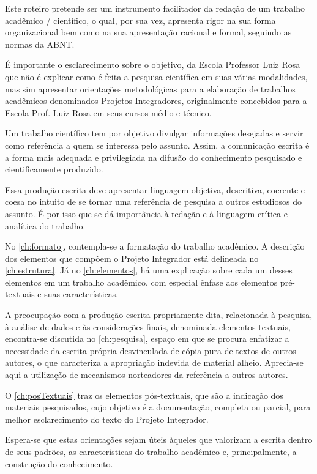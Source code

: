 \documentclass[
	12pt,				%
	openright,			%
	oneside,			%
	a4paper,			%
	english,			%
	french,				%
	spanish,			%
	brazil				%
	]{abntex2}
\begin{document}
\par Este roteiro pretende ser um instrumento facilitador da redação de um trabalho acadêmico / científico, o qual, por sua vez, apresenta rigor na sua forma organizacional bem como na sua apresentação racional e formal, seguindo as normas da ABNT.
\par É importante o esclarecimento sobre o objetivo, da Escola Professor Luiz Rosa que não é explicar como é feita a pesquisa científica em suas várias modalidades, mas sim apresentar orientações metodológicas para a elaboração de trabalhos acadêmicos denominados Projetos Integradores, originalmente concebidos para a Escola Prof. Luiz Rosa em seus cursos médio e técnico.
\par Um trabalho científico tem por objetivo divulgar informações desejadas e servir como referência a quem se interessa pelo assunto. Assim, a comunicação escrita é a forma mais adequada e privilegiada na difusão do conhecimento pesquisado e cientificamente produzido.
\par Essa produção escrita deve apresentar linguagem objetiva, descritiva, coerente e coesa no intuito de se tornar uma referência de pesquisa a outros estudiosos do assunto. É por isso que se dá importância à redação e à linguagem crítica e analítica do trabalho.
\par No \autoref{ch:formato}, contempla-se a formatação do trabalho acadêmico. A descrição dos elementos que compõem o Projeto Integrador está delineada no \autoref{ch:estrutura}.  Já no \autoref{ch:elementos}, há uma explicação sobre cada um desses elementos em um trabalho acadêmico, com especial ênfase aos elementos pré-textuais e suas características.
\par A preocupação com a produção escrita propriamente dita, relacionada à pesquisa, à análise de dados e às considerações finais, denominada elementos textuais, encontra-se discutida no \autoref{ch:pesquisa}, espaço em que se procura enfatizar a necessidade da escrita própria desvinculada de cópia pura de textos de outros autores, o que caracteriza a apropriação indevida de material alheio. Aprecia-se aqui a utilização de mecanismos norteadores da referência a outros autores.
\par O \autoref{ch:posTextuais} traz os elementos pós-textuais, que são a indicação dos materiais pesquisados, cujo objetivo é a documentação, completa ou parcial, para melhor esclarecimento do texto do Projeto Integrador.
\par Espera-se que estas orientações sejam úteis àqueles que valorizam a escrita dentro de seus padrões, as características do trabalho acadêmico e, principalmente, a construção do conhecimento.
\end{document}
